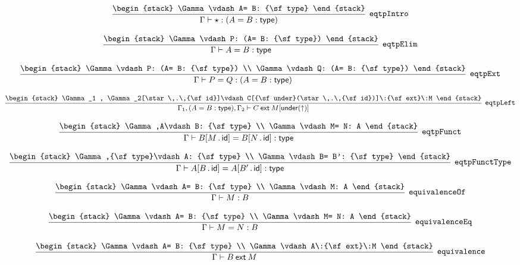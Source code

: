 \[
\infer[{\tt eqtpIntro}]{\Gamma \vdash \star : (A= B: {\sf type})}{
\begin{stack}
\Gamma \vdash A= B: {\sf type}
\end{stack}}
\]

\[
\infer[{\tt eqtpElim}]{\Gamma \vdash A= B: {\sf type}}{
\begin{stack}
\Gamma \vdash P: (A= B: {\sf type})
\end{stack}}
\]

\[
\infer[{\tt eqtpExt}]{\Gamma \vdash P= Q: (A= B: {\sf type})}{
\begin{stack}
\Gamma \vdash P: (A= B: {\sf type})
\\
\Gamma \vdash Q: (A= B: {\sf type})
\end{stack}}
\]

\[
\infer[{\tt eqtpLeft}]{\Gamma_1 ,(A= B: {\sf type}), \Gamma_2 \vdash C\:{\sf ext}\:M[{\sf under}(\uparrow )]}{
\begin{stack}
\Gamma_1 , \Gamma_2[\star \,.\,{\sf id}]\vdash C[{\sf under}(\star \,.\,{\sf id})]\:{\sf ext}\:M
\end{stack}}
\]

\[
\infer[{\tt eqtpFunct}]{\Gamma \vdash B[M\,.\,{\sf id}]= B[N\,.\,{\sf id}]: {\sf type}}{
\begin{stack}
\Gamma ,A\vdash B: {\sf type}
\\
\Gamma \vdash M= N: A
\end{stack}}
\]

\[
\infer[{\tt eqtpFunctType}]{\Gamma \vdash A[B\,.\,{\sf id}]= A[B'\,.\,{\sf id}]: {\sf type}}{
\begin{stack}
\Gamma ,{\sf type}\vdash A: {\sf type}
\\
\Gamma \vdash B= B': {\sf type}
\end{stack}}
\]

\[
\infer[{\tt equivalenceOf}]{\Gamma \vdash M: B}{
\begin{stack}
\Gamma \vdash A= B: {\sf type}
\\
\Gamma \vdash M: A
\end{stack}}
\]

\[
\infer[{\tt equivalenceEq}]{\Gamma \vdash M= N: B}{
\begin{stack}
\Gamma \vdash A= B: {\sf type}
\\
\Gamma \vdash M= N: A
\end{stack}}
\]

\[
\infer[{\tt equivalence}]{\Gamma \vdash B\:{\sf ext}\:M}{
\begin{stack}
\Gamma \vdash A= B: {\sf type}
\\
\Gamma \vdash A\:{\sf ext}\:M
\end{stack}}
\]

